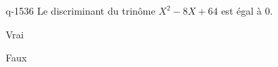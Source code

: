 \begin{truefalse}{q-1536}
Le discriminant du trinôme $X^2-8X+64$ est égal à $0$.
\item Vrai
\item* Faux
\end{truefalse}

